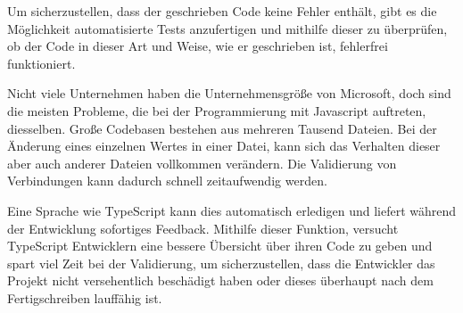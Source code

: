 Um sicherzustellen, dass der geschrieben Code keine Fehler enthält, gibt es die Möglichkeit automatisierte Tests anzufertigen und mithilfe dieser zu überprüfen, ob der Code in dieser Art und Weise, wie er geschrieben ist, fehlerfrei funktioniert.\cite{ScriptWiki}


Nicht viele Unternehmen haben die Unternehmensgröße von Microsoft, doch sind die meisten Probleme, die bei der Programmierung mit Javascript auftreten, diesselben. Große Codebasen bestehen aus mehreren Tausend Dateien. Bei der Änderung eines einzelnen Wertes in einer Datei, kann sich das Verhalten dieser aber auch anderer Dateien vollkommen verändern.
Die Validierung von Verbindungen kann dadurch schnell zeitaufwendig werden.\cite{ScriptWiki}


Eine Sprache wie TypeScript kann dies automatisch erledigen und liefert während der Entwicklung sofortiges Feedback. Mithilfe dieser Funktion, versucht TypeScript Entwicklern eine bessere Übersicht über ihren Code zu geben und spart viel Zeit bei der Validierung, um sicherzustellen, dass die Entwickler das Projekt nicht versehentlich beschädigt haben oder dieses überhaupt nach dem Fertigschreiben lauffähig ist.

\cite{ScriptWiki}
